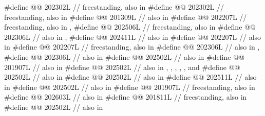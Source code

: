 \begin{codeblock}
#define @@                  202302L // freestanding, also in 
#define @@          202302L // freestanding, also in 
#define @@                      201309L // also in 
#define @@                          202207L
  // freestanding, also in , 
#define @@                  202506L // freestanding, also in 
#define @@              202306L // also in , 
#define @@                  202411L // also in 
#define @@                  202207L // also in 
#define @@                202207L // freestanding, also in 
#define @@                   202306L // also in , 
#define @@                 202306L // also in 
#define @@                   202502L // also in 
#define @@           201907L // also in 
#define @@              202502L
  // also in , , , , , and 
#define @@                202502L // also in 
#define @@                202502L // also in 
#define @@                  202511L // also in 
#define @@            202502L // also in 
#define @@              201907L // freestanding, also in 
#define @@          202603L // also in 
#define @@                201811L // freestanding, also in 
#define @@                    202502L // also in 

\end{codeblock}
